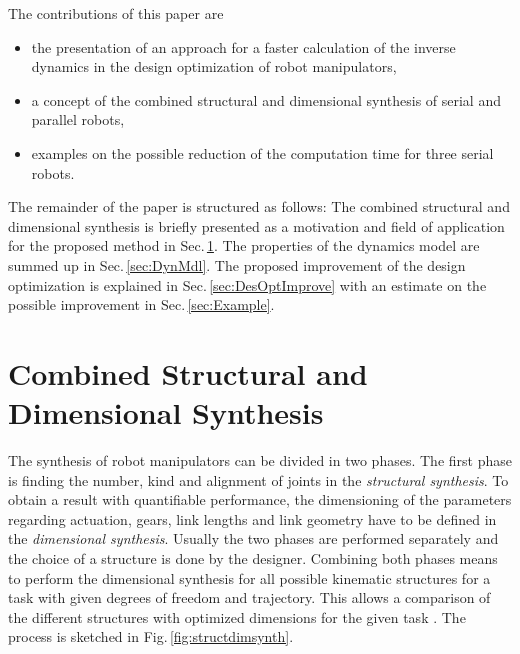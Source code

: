 \documentclass{svproc}
\begin{document}
The contributions of this paper are
\begin{itemize}
    \item the presentation of an approach for a faster calculation of the inverse dynamics in the design optimization of robot manipulators,
    \item a concept of the combined structural and dimensional synthesis of serial and parallel robots,
    \item examples on the possible reduction of the computation time for three serial robots.
\end{itemize}

The remainder of the paper is structured as follows:
The combined structural and dimensional synthesis is briefly presented as a motivation and field of application for the proposed method in Sec.\,\ref{sec:DimSynth}.
The properties of the dynamics model are summed up in Sec.\,\ref{sec:DynMdl}.
The proposed improvement of the design optimization is explained in Sec.\,\ref{sec:DesOptImprove} with an estimate on the possible improvement in Sec.\,\ref{sec:Example}.

\section{Combined Structural and Dimensional Synthesis}
\label{sec:DimSynth}

The synthesis of robot manipulators can be divided in two phases.
The first phase is finding the number, kind and alignment of joints in the \emph{structural synthesis}.
To obtain a result with quantifiable performance, the dimensioning of the parameters regarding actuation, gears, link lengths and link geometry have to be defined in the \emph{dimensional synthesis}.
Usually the two phases are performed separately and the choice of a structure is done by the designer.
Combining both phases means to perform the dimensional synthesis for all possible kinematic structures for a task with given degrees of freedom and trajectory.
This allows a comparison of the different structures with optimized dimensions for the given task \cite{RamirezKotOrt2015}.
The process is sketched in Fig.\,\ref{fig:structdimsynth}.
\end{document}
